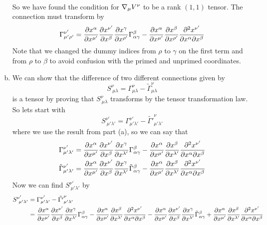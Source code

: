 \documentclass[11pt]{article}
\numberwithin{equation}{section}
\begin{document}
\begin{enumerate}[(a)]
\begin{align*}
\end{align*}
So we have found the condition for $\bold\nabla_{\mu}V^{\nu}$ to be a rank $(1,1)$ tensor. The connection must transform by
$$\Gamma^{\nu'}_{\mu'\rho'} = \frac{\partial{x^{\alpha}}}{\partial{x^{\mu'}}}\frac{\partial{x^{\nu'}}}{\partial{x^{\beta}}}\frac{\partial{x^{\gamma}}}{\partial{x^{\rho'}}}\Gamma^{\beta}_{\alpha\gamma} - \frac{\partial{x^{\alpha}}}{\partial{x^{\mu'}}}\frac{\partial{x^{\beta}}}{\partial{x^{\rho'}}}\frac{\partial^2x^{\nu'}}{\partial x^{\alpha}\partial x^{\beta}}$$
Note that we changed the dummy indices from $\rho$ to $\gamma$ on the first term and from $\rho$ to $\beta$ to avoid confusion with the primed and unprimed coordinates.

\item
We can show that the difference of two different connections given by
$$S^{\nu}_{\ \mu\lambda} = \Gamma^{\nu}_{\mu\lambda} - \tilde{\Gamma}^{\nu}_{\mu\lambda}$$
is a tensor by proving that $S^{\nu}_{\ \mu\lambda}$ transforms by the tensor transformation law. So lets start with 
$$S^{\nu'}_{\ \mu'\lambda'} = \Gamma^{\nu'}_{\mu'\lambda'} - \tilde{\Gamma'}^{\nu}_{\mu'\lambda'}$$
where we use the result from part (a), so we can say that
\begin{align*}
\Gamma^{\nu'}_{\mu'\lambda'} = \frac{\partial{x^{\alpha}}}{\partial{x^{\mu'}}}\frac{\partial{x^{\nu'}}}{\partial{x^{\beta}}}\frac{\partial{x^{\gamma}}}{\partial{x^{\lambda'}}}\Gamma^{\beta}_{\alpha\gamma} - \frac{\partial{x^{\alpha}}}{\partial{x^{\mu'}}}\frac{\partial{x^{\beta}}}{\partial{x^{\lambda'}}}\frac{\partial^2x^{\nu'}}{\partial x^{\alpha}\partial x^{\beta}}\\
\tilde{\Gamma}^{\nu'}_{\mu'\lambda'} = \frac{\partial{x^{\alpha}}}{\partial{x^{\mu'}}}\frac{\partial{x^{\nu'}}}{\partial{x^{\beta}}}\frac{\partial{x^{\gamma}}}{\partial{x^{\lambda'}}}\tilde{\Gamma}^{\beta}_{\alpha\gamma} - \frac{\partial{x^{\alpha}}}{\partial{x^{\mu'}}}\frac{\partial{x^{\beta}}}{\partial{x^{\lambda'}}}\frac{\partial^2x^{\nu'}}{\partial x^{\alpha}\partial x^{\beta}}
\end{align*}
Now we can find $S^{\nu'}_{\ \mu'\lambda'}$ by
\begin{align*}
S^{\nu'}_{\ \mu'\lambda'} &= \Gamma^{\nu'}_{\mu'\lambda'} - \tilde{\Gamma'}^{\nu}_{\mu'\lambda'}\\
&= \partiald{x^{\alpha}}{x^{\mu'}}\partiald{x^{\nu'}}{x^{\beta}}\partiald{x^{\gamma}}{x^{\lambda'}}\Gamma^{\beta}_{\alpha\gamma} - \partiald{x^{\alpha}}{x^{\mu'}}\partiald{x^{\beta}}{x^{\lambda'}}\frac{\partial^2x^{\nu'}}{\partial x^{\alpha}\partial x^{\beta}} - \partiald{x^{\alpha}}{x^{\mu'}}\partiald{x^{\nu'}}{x^{\beta}}\partiald{x^{\gamma}}{x^{\lambda'}}\tilde{\Gamma}^{\beta}_{\alpha\gamma} + \partiald{x^{\alpha}}{x^{\mu'}}\partiald{x^{\beta}}{x^{\lambda'}}\frac{\partial^2x^{\nu'}}{\partial x^{\alpha}\partial x^{\beta}}\\

\end{align*}
\end{enumerate}
\end{document}
